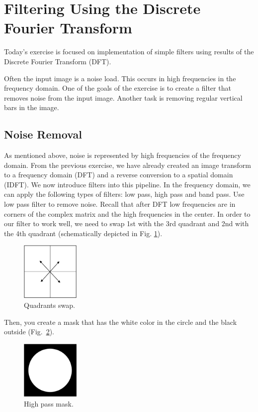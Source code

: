 \documentclass[12pt]{article}
\begin{document}
\section*{Filtering Using the Discrete Fourier Transform}

Today's exercise is focused on implementation of simple filters using results of the Discrete Fourier Transform (DFT).

Often the input image is a noise load. This occurs in high frequencies in the frequency domain.
One of the goals of the exercise is to create a filter that removes noise from the input image.
Another task is removing regular vertical bars in the image.

\subsection*{Noise Removal}

As mentioned above, noise is represented by high frequencies of the frequency domain.
From the previous exercise, we have already created an image transform to a frequency domain (DFT) and a reverse conversion to a spatial domain (IDFT).
We now introduce filters into this pipeline.
In the frequency domain, we can apply the following types of filters: low pass, high pass and band pass.
Use low pass filter to remove noise.
Recall that after DFT low frequencies are in corners of the complex matrix and the high frequencies in the center.
In order to our filter to work well, we need to swap 1st with the 3rd quadrant and 2nd with the 4th quadrant (schematically depicted in Fig. \ref{fig:quadrants}).

\begin{figure}[h]
\centering
\includegraphics[width=0.25\textwidth]{images/quadrants.png}
\caption{Quadrants swap.}
\label{fig:quadrants}
\end{figure}

Then, you create a mask that has the white color in the circle and the black outside (Fig.~\ref{fig:mask}).

\begin{figure}[h]
\centering
\includegraphics[width=0.25\textwidth]{images/mask.png}
\caption{High pass mask.}
\label{fig:mask}
\end{figure}
\end{document}
